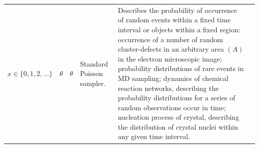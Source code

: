 \begin{longtable}{p{2cm}
    >{\raggedright\arraybackslash}p{3cm}
    >{\raggedright\arraybackslash}p{1.5cm}
    >{\raggedright\arraybackslash}p{1.5cm}
    >{\raggedright\arraybackslash}p{3cm}
    p{6cm}}
{$x\in \{0,1,2,\ldots\}$}
& \footnotesize{$\theta$}
& \footnotesize{$\theta$}
& \footnotesize{Standard Poisson sampler.}
& \footnotesize{Describes the probability of occurrence of random events within a fixed time interval or objects within a fixed region: occurrence of a number of random cluster-defects in an arbitrary area $(A)$ in the electron microscopic image;\cite{chandran2005duality} probability distributions of rare events in MD sampling;\cite{kroger2017assessing} dynamics of chemical reaction networks, describing the probability distributions for a series of random observations occur in time;\cite{anderson2011continuous} nucleation process of crystal, describing the distribution of crystal nuclei within any given time interval.\cite{jiang2011crystal} }
\end{longtable}


